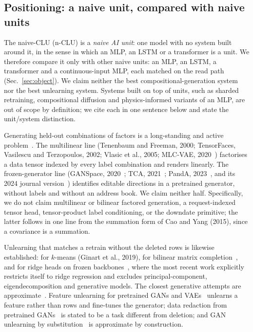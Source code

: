 \documentclass{article} %
\begin{document}
\subsection{Positioning: a naive unit, compared with naive units}
\label{sec:positioning}

The naive-CLU (n-CLU) is a \emph{naive AI unit}: one model with no system built around it, in the sense
in which an MLP, an LSTM or a transformer is a unit. We therefore compare it only with other naive
units: an MLP, an LSTM, a transformer and a continuous-input MLP, each matched on the read path
(Sec.~\ref{sec:object}). We claim neither the best compositional-generation system nor the best
unlearning system. Systems built on top of units, such as sharded retraining, compositional
diffusion and physics-informed variants of an MLP, are out of scope by definition; we cite each
in one sentence below and state the unit/system distinction.

Generating held-out combinations of factors is a long-standing and active problem~\citep{du2020compositional,liu2022compositional}. The multilinear line (Tenenbaum and Freeman, 2000\nocite{tenenbaum2000separating}; TensorFaces,
Vasilescu and Terzopoulos, 2002\nocite{vasilescu2002tensorfaces}; Vlasic et al., 2005\nocite{vlasic2005face}; MLC-VAE, 2020~\citep{georgopoulos2020multilinear}) factorises a data tensor
indexed by every label combination and renders linearly. The frozen-generator line (GANSpace,
2020~\citep{harkonen2020ganspace}; TCA, 2021~\citep{oldfield2021tensor}; PandA, 2023~\citep{oldfield2023panda}, and its 2024 journal version~\citep{oldfield2024bilinear}) identifies editable directions in a
pretrained generator, without labels and without an address book. We claim neither half.
Specifically, we do not claim multilinear or bilinear factored generation, a request-indexed
tensor head, tensor-product label conditioning, or the downdate primitive; the latter follows
in one line from the summation form of Cao and Yang (2015)\nocite{cao2015towards}, since a covariance is a summation.

Unlearning that matches a retrain without the deleted rows is likewise established: for $k$-means (Ginart et al., 2019\nocite{ginart2019making}), for bilinear
matrix completion~\citep{xu2023netflix}, and for ridge heads on frozen backbones~\citep{quan2026exact}, where the most recent work
explicitly restricts itself to ridge regression and excludes principal-component,
eigendecomposition and generative models. The closest generative attempts are approximate~\citep{kong2022approximate}.
Feature unlearning for pretrained GANs and VAEs~\citep{moon2024feature} unlearns a feature rather than rows and
fine-tunes the generator; data redaction from pretrained GANs~\citep{kong2023data} is stated to be a task different
from deletion; and GAN unlearning by substitution~\citep{sun2025generative} is approximate by construction.
\end{document}
